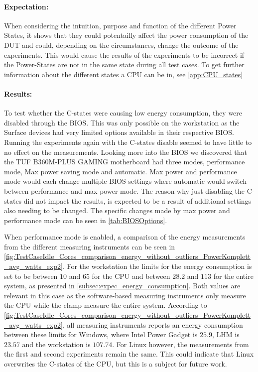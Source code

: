 \paragraph*{Expectation:} When considering the intuition, purpose and function of the different Power States, it shows that they could potentailly affect the power consumption of the DUT and could, depending on the circumstances, change the outcome of the experiments. This would cause the results of the experiments to be incorrect if the Power-States are not in the same state during all test cases. To get further information about the different states a CPU can be in, see \cref{app:CPU_states}

\paragraph*{Results:} To test whether the C-states were causing low energy consumption, they were disabled through the BIOS. This was only possible on the workstation as the Surface devices had very limited options available in their respective BIOS. Running the experiments again with the C-states disable seemed to have little to no effect on the measurements. Looking more into the BIOS we discovered that the TUF B360M-PLUS GAMING motherboard had three modes, performance mode, Max power saving mode and automatic. Max power and performance mode would each change multiple BIOS settings where automatic would switch between performance and max power mode. The reason why just disabling the C-states did not impact the results, is expected to be a result of additional settings also needing to be changed. The specific changes made by max power and performance mode can be seen in \cref{tab:BIOSOptions}.



When performance mode is enabled, a comparison of the energy measurements from the different measuring instruments can be seen in \cref{fig:TestCaseIdle_Cores_comparison_energy_without_outliers_PowerKomplett_avg_watts_exp2}. For the workstation the limits for the energy consumption is set to be between $10$ and $65$ for the CPU and between $28.2$ and $113$ for the entire system, as presented in \cref{subsec:expec_energy_consumption}. Both values are relevant in this case as the software-based measuring instruments only measure the CPU while the clamp measure the entire system. According to \cref{fig:TestCaseIdle_Cores_comparison_energy_without_outliers_PowerKomplett_avg_watts_exp2}, all measuring instruments reports an energy consumption between these limits for Windows, where Intel Power Gadget is $25.9$, LHM is $23.57$ and the workstation is $107.74$. For Linux however, the measurements from the first and second experiments remain the same. This could indicate that Linux overwrites the C-states of the CPU, but this is a subject for future work.

